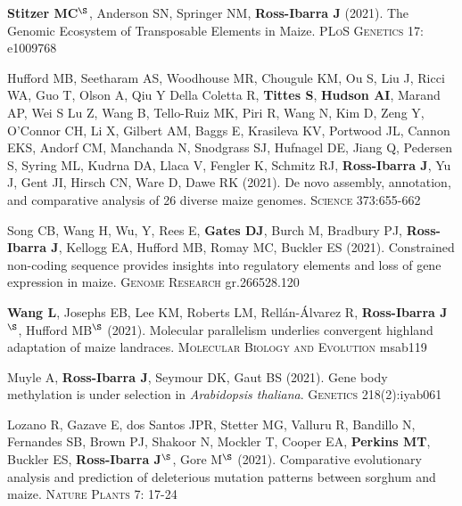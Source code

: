 \documentclass[letterpaper,10pt]{article}
\begin{document}
\begin{etaremune}
\item \textbf{Stitzer MC}$^\S$, Anderson SN, Springer NM, \textbf{Ross-Ibarra J} (2021). The Genomic Ecosystem of Transposable Elements in Maize. \textsc{PLoS Genetics} 17: e1009768

\item Hufford MB, Seetharam AS, Woodhouse MR, Chougule KM, Ou S, Liu J, Ricci WA, Guo T, Olson A, Qiu Y Della Coletta R, \textbf{Tittes S}, \textbf{Hudson AI},  Marand AP, Wei S Lu Z, Wang B, Tello-Ruiz MK, Piri R, Wang N, Kim D, Zeng Y, O'Connor CH, Li X, Gilbert AM, Baggs E, Krasileva KV, Portwood JL, Cannon EKS, Andorf CM, Manchanda N, Snodgrass SJ, Hufnagel DE, Jiang Q, Pedersen S, Syring ML, Kudrna DA, Llaca V, Fengler K, Schmitz RJ, \textbf{Ross-Ibarra J}, Yu J, Gent JI, Hirsch CN, Ware D, Dawe RK (2021). De novo assembly, annotation, and comparative analysis of 26 diverse maize genomes. \textsc{Science} 373:655-662

\item Song CB, Wang H, Wu, Y, Rees E, \textbf{Gates DJ}, Burch M,  Bradbury PJ, \textbf{Ross-Ibarra J}, Kellogg EA, Hufford MB, Romay MC, Buckler ES (2021).  Constrained non-coding sequence provides insights into regulatory elements and loss of gene expression in maize. \textsc{Genome Research} gr.266528.120 %

\item \textbf{Wang L}, Josephs EB, Lee KM, Roberts LM, Rell\'{a}n-\'{A}lvarez R, \textbf{Ross-Ibarra J}$^\S$, Hufford MB$^\S$ (2021). Molecular parallelism underlies convergent highland adaptation of maize landraces. \textsc{Molecular Biology and Evolution} msab119 %

\item Muyle A, \textbf{Ross-Ibarra J}, Seymour DK, Gaut BS (2021). Gene body methylation is under selection in \textit{Arabidopsis thaliana}. \textsc{Genetics} 218(2):iyab061 %

\item Lozano R, Gazave E, dos Santos JPR, Stetter MG, Valluru R, Bandillo N, Fernandes SB, Brown PJ, Shakoor N, Mockler T, Cooper EA, \textbf{Perkins MT}, Buckler ES, \textbf{Ross-Ibarra J}$^\S$, Gore M$^\S$ (2021). Comparative evolutionary analysis and prediction of deleterious mutation patterns between sorghum and maize. \textsc{Nature Plants} 7: 17-24  %


\end{etaremune}
\end{document}
